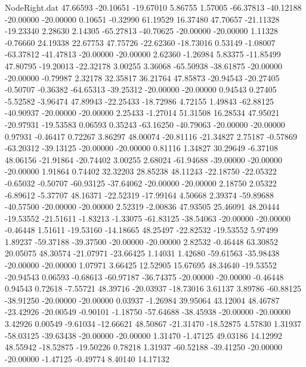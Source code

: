 \begin{filecontents}{NodeRight.dat}
  47.66593  -20.10651  -19.67010     5.86755    1.57005  -66.37813  -40.12188  -20.00000  -20.00000    0.10651   -0.32990   61.19529   16.37480
  47.70657  -21.11328  -19.23340     2.28630    2.14305  -65.27813  -40.70625  -20.00000  -20.00000    1.11328   -0.76660   24.19338   22.67753
  47.75726  -22.62360  -18.73016     0.53149   -1.08007  -63.37812  -41.47813  -20.00000  -20.00000    2.62360   -1.26984    5.83375  -11.85499
  47.80795  -19.20013  -22.32178     3.00255    3.36068  -65.50938  -38.61875  -20.00000  -20.00000   -0.79987    2.32178   32.35817   36.21764
  47.85873  -20.94543  -20.27405    -0.50707   -0.36382  -64.65313  -39.25312  -20.00000  -20.00000    0.94543    0.27405   -5.52582   -3.96474
  47.89943  -22.25433  -18.72986     4.72155    1.49843  -62.88125  -40.90937  -20.00000  -20.00000    2.25433   -1.27014   51.31508   16.28534
  47.95021  -20.97931  -19.53583     0.06593    0.35243  -63.16250  -40.79063  -20.00000  -20.00000    0.97931   -0.46417    0.72267    3.86297
  48.00074  -20.81116  -21.34827     2.75187   -0.57869  -63.20312  -39.13125  -20.00000  -20.00000    0.81116    1.34827   30.29649   -6.37108
  48.06156  -21.91864  -20.74402     3.00255    2.68024  -61.94688  -39.00000  -20.00000  -20.00000    1.91864    0.74402   32.32203   28.85238
  48.11243  -22.18750  -22.05322    -0.65032   -0.50707  -60.93125  -37.64062  -20.00000  -20.00000    2.18750    2.05322   -6.89612   -5.37707
  48.16371  -22.52319  -17.99164     4.50668    2.39374  -59.89688  -40.57500  -20.00000  -20.00000    2.52319   -2.00836   47.93505   25.46091
  48.20444  -19.53552  -21.51611    -1.83213   -1.33075  -61.83125  -38.54063  -20.00000  -20.00000   -0.46448    1.51611  -19.53160  -14.18665
  48.25497  -22.82532  -19.53552     5.97499    1.89237  -59.37188  -39.37500  -20.00000  -20.00000    2.82532   -0.46448   63.30852   20.05075
  48.30574  -21.07971  -23.66425     1.14031    1.42680  -59.61563  -35.98438  -20.00000  -20.00000    1.07971    3.66425   12.52905   15.67695
  48.34640  -19.53552  -20.94543     0.06593   -0.68613  -60.97187  -36.74375  -20.00000  -20.00000   -0.46448    0.94543    0.72618   -7.55721
  48.39716  -20.03937  -18.73016     3.61137    3.89786  -60.88125  -38.91250  -20.00000  -20.00000    0.03937   -1.26984   39.95064   43.12004
  48.46787  -23.42926  -20.00549    -0.90101   -1.18750  -57.64688  -38.45938  -20.00000  -20.00000    3.42926    0.00549   -9.61034  -12.66621
  48.50867  -21.31470  -18.52875     4.57830    1.31937  -58.03125  -39.63438  -20.00000  -20.00000    1.31470   -1.47125   49.03186   14.12992
  48.55942  -18.52875  -19.50226     0.78218    1.31937  -60.52188  -39.41250  -20.00000  -20.00000   -1.47125   -0.49774    8.40140   14.17132

\end{filecontents}
